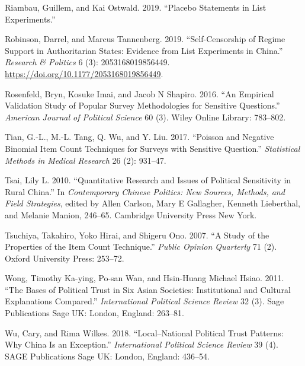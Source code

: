\documentclass[]{article}
\begin{document}
\leavevmode\hypertarget{ref-riambau2019placebo}{}%
Riambau, Guillem, and Kai Ostwald. 2019. ``Placebo Statements in List
Experiments.''

\leavevmode\hypertarget{ref-robinson2019self}{}%
Robinson, Darrel, and Marcus Tannenberg. 2019. ``Self-Censorship of
Regime Support in Authoritarian States: Evidence from List Experiments
in China.'' \emph{Research \& Politics} 6 (3): 2053168019856449.
\url{https://doi.org/10.1177/2053168019856449}.

\leavevmode\hypertarget{ref-rosenfeld2016empirical}{}%
Rosenfeld, Bryn, Kosuke Imai, and Jacob N Shapiro. 2016. ``An Empirical
Validation Study of Popular Survey Methodologies for Sensitive
Questions.'' \emph{American Journal of Political Science} 60 (3). Wiley
Online Library: 783--802.

\leavevmode\hypertarget{ref-tianetal2017poisson}{}%
Tian, G.-L., M.-L. Tang, Q. Wu, and Y. Liu. 2017. ``Poisson and Negative
Binomial Item Count Techniques for Surveys with Sensitive Question.''
\emph{Statistical Methods in Medical Research} 26 (2): 931--47.

\leavevmode\hypertarget{ref-tsai2010quantitative}{}%
Tsai, Lily L. 2010. ``Quantitative Research and Issues of Political
Sensitivity in Rural China.'' In \emph{Contemporary Chinese Politics:
New Sources, Methods, and Field Strategies}, edited by Allen Carlson,
Mary E Gallagher, Kenneth Lieberthal, and Melanie Manion, 246--65.
Cambridge University Press New York.

\leavevmode\hypertarget{ref-tsuchiya2007study}{}%
Tsuchiya, Takahiro, Yoko Hirai, and Shigeru Ono. 2007. ``A Study of the
Properties of the Item Count Technique.'' \emph{Public Opinion
Quarterly} 71 (2). Oxford University Press: 253--72.

\leavevmode\hypertarget{ref-wong2011bases}{}%
Wong, Timothy Ka-ying, Po-san Wan, and Hsin-Huang Michael Hsiao. 2011.
``The Bases of Political Trust in Six Asian Societies: Institutional and
Cultural Explanations Compared.'' \emph{International Political Science
Review} 32 (3). Sage Publications Sage UK: London, England: 263--81.

\leavevmode\hypertarget{ref-wu2018local}{}%
Wu, Cary, and Rima Wilkes. 2018. ``Local--National Political Trust
Patterns: Why China Is an Exception.'' \emph{International Political
Science Review} 39 (4). SAGE Publications Sage UK: London, England:
436--54.

\newpage

\setlength{\parindent}{0.2in}
\setlength{\leftskip}{0in}
\end{document}
